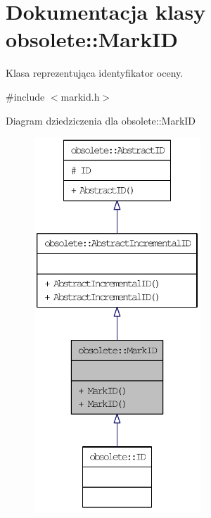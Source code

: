 \hypertarget{classobsolete_1_1MarkID}{
\section{Dokumentacja klasy obsolete::MarkID}
\label{classobsolete_1_1MarkID}
}


Klasa reprezentująca identyfikator oceny.  




{\ttfamily \#include $<$markid.h$>$}



Diagram dziedziczenia dla obsolete::MarkID\nopagebreak
\begin{figure}[H]
\begin{center}
\leavevmode
\includegraphics[height=400pt]{classobsolete_1_1MarkID__inherit__graph}
\end{center}
\end{figure}



